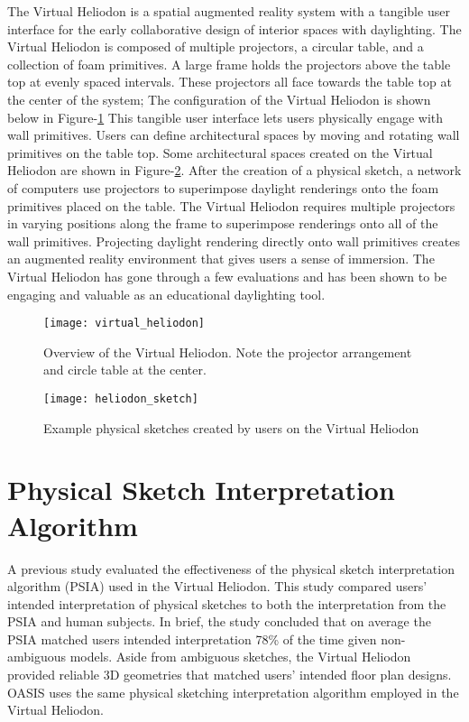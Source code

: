 	The Virtual Heliodon is a spatial augmented reality system with a tangible user interface for the early collaborative design of interior spaces with daylighting\cite{sheng2009virtual, cutler2009inferring,nasman2013physical,nasman2013evaluation,cutler2010interpreting}. 
	The Virtual Heliodon is composed of multiple projectors, a circular table, and a collection of foam primitives.  
	A large frame holds the projectors above the table top at evenly spaced intervals. 
	These projectors all face towards the table top at the center of the system;
	The configuration of the Virtual Heliodon is shown below in Figure-\ref{fig:virtual_heliodon}
	This tangible user interface lets users physically engage with wall primitives. 
	Users can define architectural spaces by moving and rotating wall primitives on the table top.
	Some architectural spaces created on the Virtual Heliodon are shown in Figure-\ref{fig:heliodon_sketch}.
	After the creation of a physical sketch, a network of computers use projectors to superimpose daylight renderings onto the foam primitives placed on the table.
	The Virtual Heliodon requires multiple projectors in varying positions along the frame to superimpose renderings onto all of the wall primitives.
	Projecting daylight rendering directly onto wall primitives creates an augmented reality environment that gives users a sense of immersion\cite{nasman2013evaluation}.
	The Virtual Heliodon has gone through a few evaluations and has been shown to be engaging and valuable as an educational daylighting tool\cite{nasman2013evaluation}.

	\begin{figure}[h]
	\centering
	\texttt{[image: virtual\_heliodon]}
	\caption{Overview of the Virtual Heliodon. Note the projector arrangement and circle table at the center.}
	\label{fig:virtual_heliodon}
	\end{figure}

	\begin{figure}[h]
	\centering
	\texttt{[image: heliodon\_sketch]}
	\caption{Example physical sketches created by users on the Virtual Heliodon}
	\label{fig:heliodon_sketch}
	\end{figure}

\section{Physical Sketch Interpretation Algorithm}

	A previous study evaluated the effectiveness of the physical sketch interpretation algorithm (PSIA) used in the Virtual Heliodon\cite{cutler2009inferring}.
	This study compared users' intended interpretation of physical sketches to both the
	interpretation from the PSIA and human subjects.
	In brief, the study concluded that on average the PSIA matched users intended interpretation 78\% of the time given non-ambiguous models\cite{cutler2009inferring}.
	Aside from ambiguous sketches, the Virtual Heliodon provided reliable 3D geometries that matched users' intended floor plan designs.
	OASIS uses the same physical sketching interpretation algorithm employed in the Virtual Heliodon.\\

